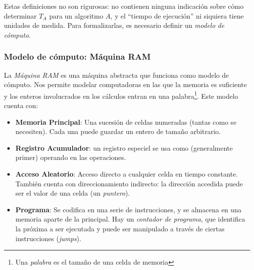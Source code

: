 Estas definiciones no son rigurosas: no contienen ninguna indicación sobre cómo determinar $T_A$ para un algoritmo $A$, y el ``tiempo de ejecución'' ni siquiera tiene unidades de medida. Para formalizarlas, es necesario definir un \textit{modelo de cómputo}.

\subsubsection{Modelo de cómputo: Máquina RAM}
\label{maquina-ram}

La \textit{Máquina RAM} es una máquina abstracta que funciona como modelo de cómputo. Nos permite modelar computadoras en las que la memoria es suficiente y los enteros involucrados en los cálculos entran en una palabra\footnote{Una \textit{palabra} es el tamaño de una celda de memoria}. Este modelo cuenta con:
\begin{itemize}
    \item \textbf{Memoria Principal}: Una sucesión de celdas numeradas (tantas como se necesiten). Cada una puede guardar un entero de tamaño arbitrario.
    \item \textbf{Registro Acumulador}: un registro especiel se usa como (generalmente primer) operando en las operaciones.
    \item \textbf{Acceso Aleatorio}: Acceso directo a cualquier celda en tiempo constante. También cuenta con direccionamiento indirecto: la dirección accedida puede ser el valor de una celda (un \textit{puntero}).
    \item \textbf{Programa}: Se codifica en una serie de instrucciones, y se almacena en una memoria aparte de la principal. Hay un \textit{contador de programa}, que identifica la próxima a ser ejecutada y puede ser manipulado a través de ciertas instrucciones (\textit{jumps}).
\end{itemize}

